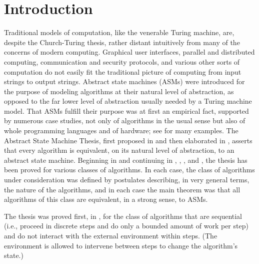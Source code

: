 \documentclass{LMCS}
\theoremstyle{definition}
\begin{document}

\maketitle
\vfill

\section{Introduction}\label{intro}

Traditional models of computation, like the venerable Turing machine,
are, despite the Church-Turing thesis, rather distant intuitively from
many of the concerns of modern computing.  Graphical user interfaces,
parallel and distributed computing, communication and security
protocols, and various other sorts of computation do not easily fit
the traditional picture of computing from input strings to output
strings.  Abstract state machines (ASMs) were introduced for the
purpose of modeling algorithms at their natural level of abstraction,
as opposed to the far lower level of abstraction usually needed by a
Turing machine model.  That ASMs fulfill their purpose was at first an
empirical fact, supported by numerous case studies, not only of
algorithms in the usual sense but also of whole programming languages
and of hardware; see \cite{web} for many examples.  The Abstract State
Machine Thesis, first proposed in \cite{G64.5} and then
elaborated in \cite{G92,G103}, asserts that every algorithm is
equivalent, on its natural level of abstraction, to an abstract state
machine.  Beginning in \cite{seqth} and continuing in \cite{parth},
\cite{oa1}, \cite{oa2}, and \cite{oa3}, the thesis has been proved for
various classes of algorithms.  In each case, the class of algorithms
under consideration was defined by postulates describing, in very
general terms, the nature of the algorithms, and in each case the main
theorem was that all algorithms of this class are equivalent, in a
strong sense, to ASMs.

The thesis was proved first, in \cite{seqth}, for the class of
algorithms that are sequential (i.e., proceed in discrete steps and do
only a bounded amount of work per step) and do not interact with the
external environment within steps.  (The environment is allowed to
intervene between steps to change the algorithm's state.)  
\end{document}
